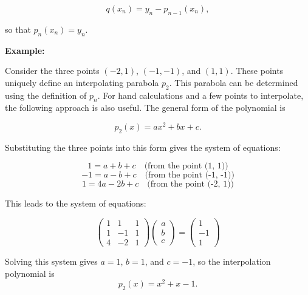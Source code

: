 \[
	q(x_n) = y_n - p_{n-1}(x_n),
\]

so that \(p_n(x_n) = y_n\). 

\QED

\textbf{Example:}

Consider the three points \((-2, 1)\), \((-1, -1)\), and \((1, 1)\). 
These points uniquely define an interpolating parabola \(p_2\). This parabola can be 
determined using the definition of \(p_n\). 
For hand calculations and a few 
points to interpolate, the following approach is also useful. The general form of the polynomial is 

\[
	p_2(x) = ax^2 + bx + c.
\]

Substituting the three points into this form gives the system of equations:

\[
	1 = a + b + c \quad \text{(from the point (1, 1))}
\]
\[
	-1 = a - b + c \quad \text{(from the point (-1, -1))}
\]
\[
	1 = 4a - 2b + c \quad \text{(from the point (-2, 1))}
\]

This leads to the system of equations:

\[
	\begin{pmatrix}
	1 & 1 & 1 \\
	1 & -1 & 1 \\
	4 & -2 & 1
	\end{pmatrix}
	\begin{pmatrix}
	a \\
	b \\
	c
	\end{pmatrix}
	=
	\begin{pmatrix}
	1 \\
	-1 \\
	1
	\end{pmatrix}
\]

Solving this system gives \(a = 1\), \(b = 1\), and \(c = -1\), so the interpolation polynomial is
\[
	p_2(x) = x^2 + x - 1.
\]

